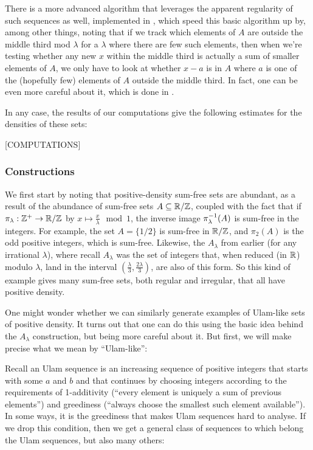 \documentclass{article}
\theoremstyle{definition}
\theoremstyle{remark}
\numberwithin{equation}{section}
\begin{document}
{There is a more advanced algorithm that leverages the apparent
regularity of such sequences as well, implemented in
\cite{knuth:note}, which speed this basic algorithm up by, among
other things, noting that if we track which elements of $A$ are
outside the middle third mod $\lambda$ for a $\lambda$ where there are
few such elements, then when we're testing whether any new $x$ within
the middle third is actually a sum of smaller elements of $A$, we only
have to look at whether $x - a$ is in $A$ where $a$ is one of the
(hopefully few) elements of $A$ outside the middle third.  In fact,
one can be even more careful about it, which is done in
\cite{knuth:note}.

In any case, the results of our computations give the following
estimates for the densities of these sets: 

{\color{red}[COMPUTATIONS]}

\subsubsection{Constructions}

We first start by noting that positive-density sum-free sets are
abundant, as a result of the abundance of sum-free sets
$A \subseteq \mathbb{R}/\mathbb{Z}$, coupled with the fact that if
$\pi_\lambda : \mathbb{Z}^+ \to \mathbb{R}/\mathbb{Z}$ by
$x \mapsto \frac{x}{\lambda} \mod{1}$, the inverse image
$\pi_\lambda^{-1}(A)$ is sum-free in the integers.  For example, the
set $A = \{1/2\}$ is sum-free in $\mathbb{R}/\mathbb{Z}$, and $\pi_2(A)$ is the odd
positive integers, which is sum-free.  Likewise, the $A_\lambda$ from
earlier (for any irrational $\lambda$), where recall $A_\lambda$ was
the set of integers that, when reduced (in $\mathbb{R}$) modulo $\lambda$,
land in the interval $(\frac{\lambda}{3}, \frac{2\lambda}{3})$, are
also of this form.  So this kind of example gives many sum-free sets,
both regular and irregular, that all have positive density.

One might wonder whether we can similarly generate examples of
Ulam-like sets of positive density.  It turns out that one can do this
using the basic idea behind the $A_\lambda$ construction, but being
more careful about it.  But first, we will make precise what we mean
by ``Ulam-like'': 

Recall an Ulam sequence is an increasing sequence of positive integers
that starts with some $a$ and $b$ and that continues by choosing
integers according to the requirements of 1-additivity (``every
element is uniquely a sum of previous elements'') and greediness
(``always choose the smallest such element available'').  In some
ways, it is the greediness that makes Ulam sequences hard to analyse.
If we drop this condition, then we get a general class of sequences to
which belong the Ulam sequences, but also many others:

}
\end{document}
